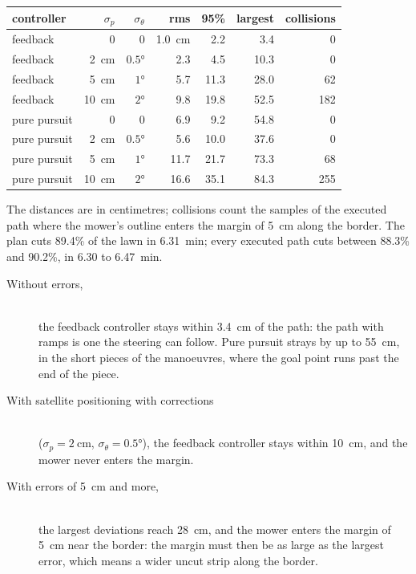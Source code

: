 \begin{center}
\begin{tabular}{@{}lrrrrrr@{}}
  \toprule
  controller & $\sigma_p$ & $\sigma_\theta$ & rms & 95\% & largest
    & collisions \\
  \midrule
  feedback & 0 & 0 & \SI{1.0}{\centi\metre} & 2.2 & 3.4 & 0 \\
  feedback & \SI{2}{\centi\metre} & $0.5°$ & 2.3 & 4.5 & 10.3 & 0 \\
  feedback & \SI{5}{\centi\metre} & $1°$ & 5.7 & 11.3 & 28.0 & 62 \\
  feedback & \SI{10}{\centi\metre} & $2°$ & 9.8 & 19.8 & 52.5 & 182 \\
  pure pursuit & 0 & 0 & 6.9 & 9.2 & 54.8 & 0 \\
  pure pursuit & \SI{2}{\centi\metre} & $0.5°$ & 5.6 & 10.0 & 37.6 & 0 \\
  pure pursuit & \SI{5}{\centi\metre} & $1°$ & 11.7 & 21.7 & 73.3 & 68 \\
  pure pursuit & \SI{10}{\centi\metre} & $2°$ & 16.6 & 35.1 & 84.3 & 255 \\
  \bottomrule
\end{tabular}
\end{center}

The distances are in centimetres; collisions count the samples of the
executed path where the mower's outline enters the margin of
\SI{5}{\centi\metre} along the border. The plan cuts 89.4\% of the lawn in
\SI{6.31}{\minute}; every executed path cuts between 88.3\% and 90.2\%, in
6.30 to \SI{6.47}{\minute}.

\begin{description}
  \item[Without errors,]
    \leavevmode\\
    the feedback controller stays within \SI{3.4}{\centi\metre} of the
    path: the path with ramps is one the steering can follow. Pure pursuit
    strays by up to \SI{55}{\centi\metre}, in the short pieces of the
    manoeuvres, where the goal point runs past the end of the piece.
  \item[With satellite positioning with corrections]
    \leavevmode\\
    ($\sigma_p = \SI{2}{\centi\metre}$, $\sigma_\theta = 0.5°$), the
    feedback controller stays within \SI{10}{\centi\metre}, and the mower
    never enters the margin.
  \item[With errors of \SI{5}{\centi\metre} and more,]
    \leavevmode\\
    the largest deviations reach \SI{28}{\centi\metre}, and the mower enters
    the margin of \SI{5}{\centi\metre} near the border: the margin must
    then be as large as the largest error, which means a wider uncut strip
    along the border.
\end{description}

